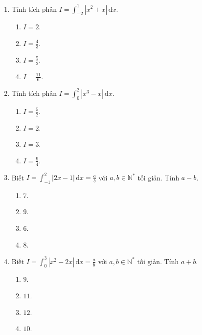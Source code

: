 \documentclass[12pt]{article}
\begin{document}
\begin{enumerate}[label=\textbf{Câu \arabic*.}]
		\item Tính tích phân $I = \displaystyle \int_{-2}^{1} |x^2 + x|\,\mathrm{d}x$.
		\begin{multicols}{4}
			\begin{enumerate}[label=\textbf{\Alph*.}]
				\item $I = 2$.
				\item $I = \frac{4}{3}$.
				\item $I = \frac{5}{2}$.
				\item $I = \frac{11}{6}$.
			\end{enumerate}
		\end{multicols}
		
		\item Tính tích phân $I = \displaystyle \int_{0}^{2} |x^3 - x|\,\mathrm{d}x$.
		\begin{multicols}{4}
			\begin{enumerate}[label=\textbf{\Alph*.}]
				\item $I = \frac{5}{2}$.
				\item $I = 2$.
				\item $I = 3$.
				\item $I = \frac{9}{4}$.
			\end{enumerate}
		\end{multicols}
		
		\item Biết $I = \displaystyle \int_{-1}^{2} |2x - 1|\,\mathrm{d}x = \frac{a}{b}$ với $a, b \in \mathbb{N}^*$ tối giản. Tính $a - b$.
		\begin{multicols}{4}
			\begin{enumerate}[label=\textbf{\Alph*.}]
				\item $7$.
				\item $9$.
				\item $6$.
				\item $8$.
			\end{enumerate}
		\end{multicols}
		
		\item Biết $I = \displaystyle \int_{0}^{3} |x^2 - 2x|\,\mathrm{d}x = \frac{a}{b}$ với $a, b \in \mathbb{N}^*$ tối giản. Tính $a + b$.
		\begin{multicols}{4}
			\begin{enumerate}[label=\textbf{\Alph*.}]
				\item $9$.
				\item $11$.
				\item $12$.
				\item $10$.
			\end{enumerate}
		\end{multicols}
		

\end{enumerate}
\end{document}
